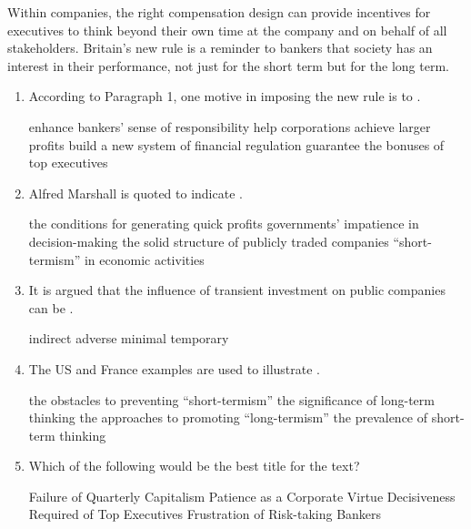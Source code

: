 Within companies, the right compensation design can provide incentives for
executives to think beyond their own time at the company and on behalf
of all stakeholders. Britain's new rule is a reminder to bankers that
society has an interest in their performance, not just for the short
term but for the long term.

\begin{enumerate}[resume]
	\item
According to Paragraph 1, one motive in imposing the new rule is to \lineread.

\fourchoices
{enhance bankers' sense of responsibility}
{help corporations achieve larger profits}
{build a new system of financial regulation}
{guarantee the bonuses of top executives}


\item
Alfred Marshall is quoted to indicate \lineread.

\fourchoices
{the conditions for generating quick profits}
{governments' impatience in decision-making}
{the solid structure of publicly traded companies}
{``short-termism'' in economic activities}


\item
 It is argued that the influence of transient investment on public
companies can be \lineread.


\fourchoices
{indirect}
{adverse}
{minimal}
{temporary}



\item
The US and France examples are used to illustrate \lineread.


\fourchoices
{the obstacles to preventing ``short-termism''}
{the significance of long-term thinking}
{the approaches to promoting ``long-termism''}
{the prevalence of short-term thinking}


\item
Which of the following would be the best title for the text?

\fourchoices
{Failure of Quarterly Capitalism}
{Patience as a Corporate Virtue}
{Decisiveness Required of Top Executives}
{Frustration of Risk-taking Bankers}


\end{enumerate}



